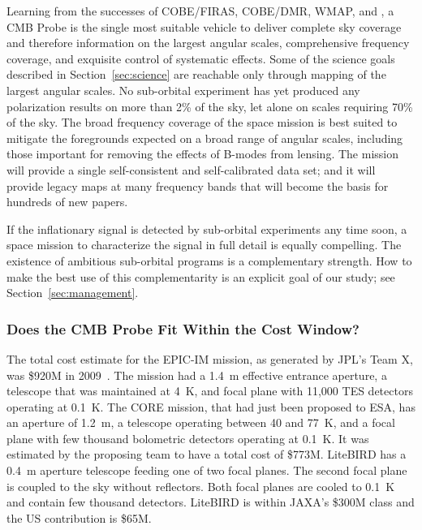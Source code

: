 Learning from the successes of COBE/FIRAS, COBE/DMR, WMAP, and \planck, a
CMB Probe is the single most suitable vehicle to deliver complete sky coverage 
and therefore information on the largest angular scales, 
comprehensive frequency coverage, and exquisite control of systematic effects. 
Some of the science goals described in Section~\ref{sec:science} 
are reachable only through mapping of the largest angular scales. No sub-orbital experiment 
has yet produced any polarization results on more than 2\% of the sky, let alone 
on scales requiring 70\% of the sky. The broad frequency coverage of the space 
mission is best suited to mitigate the foregrounds expected on a broad range of angular 
scales, including those important for removing the effects of B-modes from lensing. 
The mission will provide a single self-consistent and self-calibrated data set;  and it  
will provide legacy maps at many frequency bands that will become the basis for 
hundreds of new papers. 

If the inflationary signal is detected by sub-orbital experiments
any time soon, a space mission to characterize the signal in full detail is equally compelling. 
The existence of ambitious sub-orbital programs is a complementary strength. How 
to make the best use of this complementarity is an explicit goal of our study; 
see Section~\ref{sec:management}.

\vspace{-0.18in}

\subsubsection{Does the CMB Probe Fit Within the Cost Window?} 

\vspace{-0.05in}

The total cost estimate for the EPIC-IM mission, as generated by JPL's Team X, was \$920M in 2009~\cite{}. 
The mission had a 1.4~m effective entrance aperture, a telescope that was maintained
at 4~K, and focal plane with 11,000 TES detectors operating at 0.1~K.  The CORE mission, that had just been 
proposed to ESA, has an aperture of 1.2~m, a telescope operating 
between 40 and 77~K, and a focal plane with few thousand bolometric detectors operating at 0.1~K. 
It was estimated by the proposing team to have a total cost of \$773M.  
LiteBIRD has a 0.4~m aperture telescope feeding one of two focal planes. The second 
focal plane is coupled to the sky without reflectors. Both focal planes are cooled to 
0.1~K and contain few thousand detectors. LiteBIRD is within JAXA's \$300M class and the 
US contribution is \$65M.  

